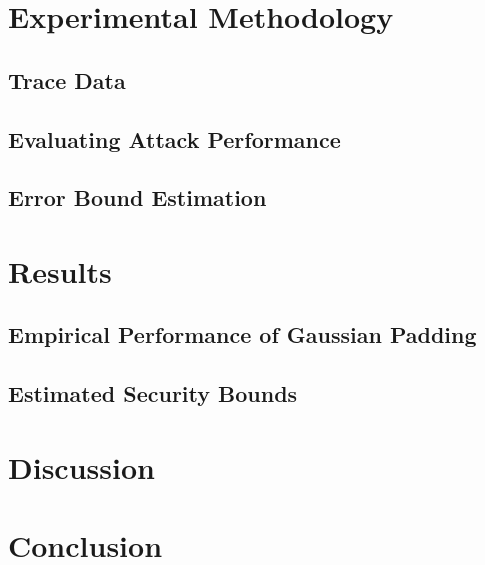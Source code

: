 \documentclass[
	ruledheaders=chapter,
	class=report,
	thesis={type=master, department=inf},
	accentcolor=1c,
	custommargins=true,
	marginpar=false,
	parskip=half-,
	fontsize=11pt,
]{tudapub}
\begin{document}
	\chapter{Experimental Methodology}
	\label{methods}

	\section{Trace Data}
	\label{dataset_quality}

	\section{Evaluating Attack Performance}
	\label{pipeline}

	\section{Error Bound Estimation}
	\label{error_bound_estimation}

	\chapter{Results}
	\label{results}

	\section{Empirical Performance of Gaussian Padding}
	\label{performance}

	\section{Estimated Security Bounds}
	\label{security_bounds}

	\chapter{Discussion}
	\label{discussion}

	\chapter{Conclusion}
	\label{conclusion}

	\pagebreak
	\setcounter{page}{5}
	\printbibliography

	\cleardoublepage
	\listoffigures

	\cleardoublepage
	\listoftables
\end{document}
